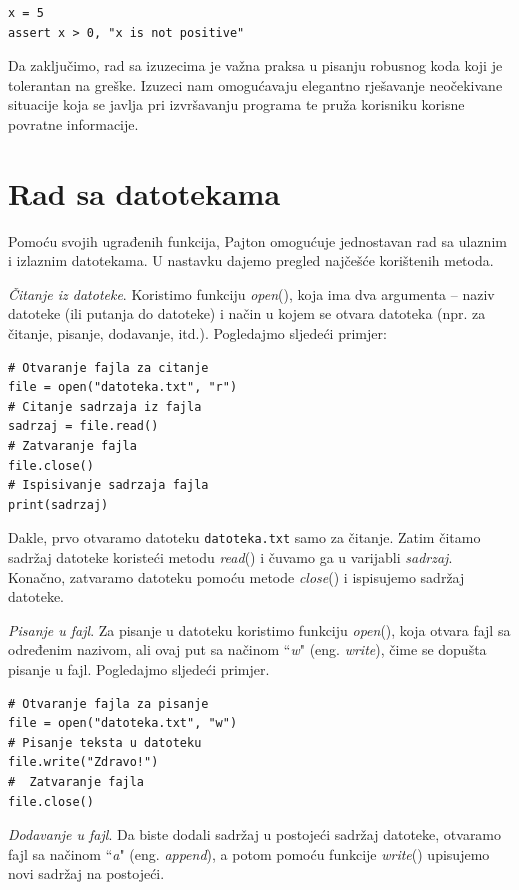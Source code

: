 \begin{verbatim}
x = 5
assert x > 0, "x is not positive"
\end{verbatim}

Da zaključimo, rad sa izuzecima je važna praksa u pisanju robusnog koda koji je tolerantan na greške. Izuzeci nam omogućavaju elegantno rješavanje neočekivane situacije koja se javlja pri izvršavanju programa te pruža  korisniku korisne povratne informacije. 

\section{Rad sa datotekama}

Pomoću svojih ugrađenih funkcija, Pajton omogućuje jednostavan rad sa ulaznim i izlaznim datotekama. U nastavku dajemo pregled najčešće korište\-nih metoda.

\textit{Čitanje iz datoteke}. Koristimo funkciju \textit{open}(), koja ima dva argu\-menta -- naziv datoteke (ili putanja do datoteke) i način u kojem se otvara datoteka (npr. za čitanje, pisanje, dodavanje, itd.). Pogledajmo sljedeći primjer: 
\begin{verbatim}
# Otvaranje fajla za citanje
file = open("datoteka.txt", "r")
# Citanje sadrzaja iz fajla 
sadrzaj = file.read()
# Zatvaranje fajla
file.close()
# Ispisivanje sadrzaja fajla 
print(sadrzaj)
\end{verbatim}

Dakle, prvo otvaramo datoteku  \texttt{datoteka.txt} samo za čitanje. Zatim čitamo sadržaj datoteke koristeći metodu \textit{read}() i čuvamo ga u varijabli \textit{sadrzaj}. Konačno, zatvaramo datoteku pomoću metode \textit{close}() i ispisujemo sadržaj datoteke. 



\textit{Pisanje u fajl}. Za pisanje u datoteku koristimo funkciju \textit{open}(), koja otvara fajl sa određenim nazivom, ali ovaj put sa načinom ``\textit{w}" (eng. \textit{write}), čime se dopušta pisanje u fajl. Pogledajmo sljedeći primjer.
\begin{verbatim}
# Otvaranje fajla za pisanje
file = open("datoteka.txt", "w")
# Pisanje teksta u datoteku
file.write("Zdravo!")
#  Zatvaranje fajla 
file.close()
\end{verbatim}


\textit{Dodavanje u fajl}. Da biste dodali sadržaj u postojeći sadržaj datoteke, otvaramo fajl sa načinom ``\textit{a}" (eng. \textit{append}), a potom pomoću funkcije \textit{write}() upisujemo novi sadržaj na postojeći. 

